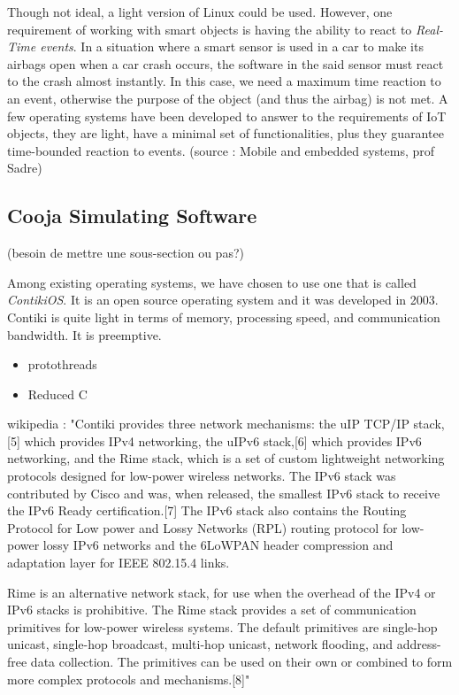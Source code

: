 Though not ideal, a light version of Linux could be used. However, one requirement of working with smart objects is having the ability to react to \textit{Real-Time events}. In a situation where a smart sensor is used in a car to make its airbags open when a car crash occurs, the software in the said sensor must react to the crash almost instantly. In this case, we need a maximum time reaction to an event, otherwise the purpose of the object (and thus the airbag) is not met. A few operating systems have been developed to answer to the requirements of IoT objects, they are light, have a minimal set of functionalities, plus they guarantee time-bounded reaction to events. (source : Mobile and embedded systems, prof Sadre)\\

\subsection{Cooja Simulating Software}
(besoin de mettre une sous-section ou pas?)

Among existing operating systems, we have chosen to use one that is called \textit{ContikiOS}. It is an open source operating system and it was developed in 2003. Contiki is quite light in terms of memory, processing speed, and communication bandwidth. It is preemptive.\\


\begin{itemize}
\item protothreads
\item Reduced C
\end{itemize}
wikipedia : "Contiki provides three network mechanisms: the uIP TCP/IP stack,[5] which provides IPv4 networking, the uIPv6 stack,[6] which provides IPv6 networking, and the Rime stack, which is a set of custom lightweight networking protocols designed for low-power wireless networks. The IPv6 stack was contributed by Cisco and was, when released, the smallest IPv6 stack to receive the IPv6 Ready certification.[7] The IPv6 stack also contains the Routing Protocol for Low power and Lossy Networks (RPL) routing protocol for low-power lossy IPv6 networks and the 6LoWPAN header compression and adaptation layer for IEEE 802.15.4 links.

Rime is an alternative network stack, for use when the overhead of the IPv4 or IPv6 stacks is prohibitive. The Rime stack provides a set of communication primitives for low-power wireless systems. The default primitives are single-hop unicast, single-hop broadcast, multi-hop unicast, network flooding, and address-free data collection. The primitives can be used on their own or combined to form more complex protocols and mechanisms.[8]"

